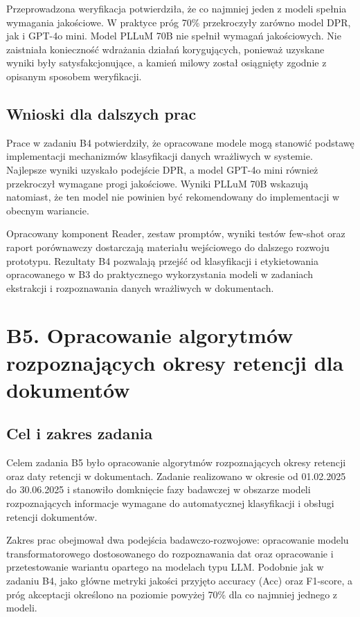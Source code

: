 \documentclass[12pt,a4paper]{report}
\begin{document}
Przeprowadzona weryfikacja potwierdziła, że co najmniej jeden z modeli spełnia wymagania jakościowe. W praktyce próg 70\% przekroczyły zarówno model DPR, jak i GPT-4o mini. Model PLLuM 70B nie spełnił wymagań jakościowych. Nie zaistniała konieczność wdrażania działań korygujących, ponieważ uzyskane wyniki były satysfakcjonujące, a kamień milowy został osiągnięty zgodnie z opisanym sposobem weryfikacji.

\subsection{Wnioski dla dalszych prac}
Prace w zadaniu B4 potwierdziły, że opracowane modele mogą stanowić podstawę implementacji mechanizmów klasyfikacji danych wrażliwych w systemie. Najlepsze wyniki uzyskało podejście DPR, a model GPT-4o mini również przekroczył wymagane progi jakościowe. Wyniki PLLuM 70B wskazują natomiast, że ten model nie powinien być rekomendowany do implementacji w obecnym wariancie.

Opracowany komponent Reader, zestaw promptów, wyniki testów few-shot oraz raport porównawczy dostarczają materiału wejściowego do dalszego rozwoju prototypu. Rezultaty B4 pozwalają przejść od klasyfikacji i etykietowania opracowanego w B3 do praktycznego wykorzystania modeli w zadaniach ekstrakcji i rozpoznawania danych wrażliwych w dokumentach.



\section{B5. Opracowanie algorytmów rozpoznających okresy retencji dla dokumentów}
\subsection{Cel i zakres zadania}
Celem zadania B5 było opracowanie algorytmów rozpoznających okresy retencji oraz daty retencji w dokumentach. Zadanie realizowano w okresie od 01.02.2025 do 30.06.2025 i stanowiło domknięcie fazy badawczej w obszarze modeli rozpoznających informacje wymagane do automatycznej klasyfikacji i obsługi retencji dokumentów.

Zakres prac obejmował dwa podejścia badawczo-rozwojowe: opracowanie modelu transformatorowego dostosowanego do rozpoznawania dat oraz opracowanie i przetestowanie wariantu opartego na modelach typu LLM. Podobnie jak w zadaniu B4, jako główne metryki jakości przyjęto accuracy (Acc) oraz F1-score, a próg akceptacji określono na poziomie powyżej 70\% dla co najmniej jednego z modeli.
\end{document}
